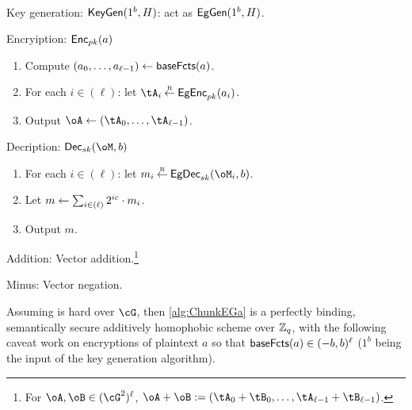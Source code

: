 \begin{algorithm}\label{alg:ChunkEGa}~
	
	\item[Key generation:] $\mathsf{KeyGen}(1^b,H)$: act as $\mathsf{EgGen}(1^b,H)$.
	
	\item[Encryiption:] $\mathsf{Enc}_{pk}(a)$
	
	\begin{enumerate}
		\item Compute $(a_0,\ldots,a_{\ell-1}) \leftarrow \mathsf{baseFcts}(a)$.
		
		\item For each $i\in (\ell)$: let $\tA_i \getsr \EgEnc_\pk(a_i)$.
		
		\item Output $\oA \asn (\tA_0,\ldots, \tA_{\ell-1})$.
		
	\end{enumerate}
	 
	\item[Decription:] $\Dec_\sk(\oM,b)$   
	\begin{enumerate}
		\item 	 For each $i\in (\ell)$: let $m_i \getsr \EgDec_\sk(\oM_i,b)$.
		
		\item Let  $m \leftarrow \sum_{i \in (\ell)}   2^{i c} \cdot  m_i $.
		
		\item Output $m$.
	\end{enumerate}
	
	\item[Addition:] Vector addition.\footnote{For $\oA,\oB \in (\cG^2)^\ell$, $\oA +\oB \eqdef (\tA_0+\tB_0,\ldots,\tA_{\ell-1}+\tB_{\ell-1})$.}
	
	\item[Minus:]  Vector negation.
	                     
	
\end{algorithm}


\begin{theorem}\label{thm:ChunkEG}
	Assuming \DDH is hard over $\cG$, then \cref{alg:ChunkEGa} is  a perfectly binding,  semantically secure additively homophobic scheme over ${\mathbb Z}_q$, with the following caveat work on encryptions of plaintext  $a$ so that $\mathsf{baseFcts}(a)\in (-b,b)^\ell$ ($1^b$ being the input of the key generation algorithm).
\end{theorem}


